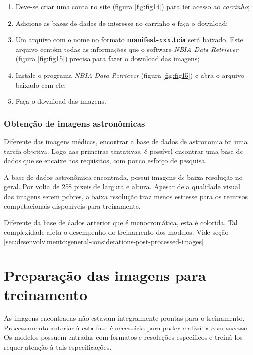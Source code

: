 \begin{enumerate}
    \item Deve-se criar uma conta no site \cite{cancer_imaging_archive_cancer_2022} (figura \ref{fig:fig14}) para ter acesso ao \textit{carrinho};

    \item Adicione as bases de dados de interesse no carrinho e faça o download;

    \item Um arquivo com o nome no formato \textbf{manifest-xxx.tcia} será baixado. Este arquivo contém todas as informações que o software \textit{NBIA Data Retriever} (figura \ref{fig:fig15}) precisa para fazer o download das imagens;

    \item Instale o programa \textit{NBIA Data Retriever} (figura \ref{fig:fig15}) e abra o arquivo baixado com ele;

    \item Faça o download das imagens.
\end{enumerate}

\subsubsection{Obtenção de imagens astronômicas}
\label{sec:imagens_astronomicas}

Diferente das imagens médicas, encontrar a base de dados de astronomia foi uma tarefa objetiva. Logo nas primeiras tentativas, é possível encontrar uma base de dados que se encaixe nos requisitos, com pouco esforço de pesquisa.

A base de dados astronômica encontrada, possui imagens de baixa resolução no geral. Por volta de 258 pixeis de largura e altura. Apesar de a qualidade visual das imagens serem pobres, a baixa resolução traz menos estresse para os recursos computacionais disponíveis para treinamento.

Diferente da base de dados anterior que é monocromática, esta é colorida. Tal complexidade afeta o desempenho do treinamento dos modelos. Vide seção \ref{sec:desenvolvimento:general-considerations-post-processed-images}

\section{Preparação das imagens para treinamento}
\label{sec:prep-imgs}

As imagens encontradas não estavam integralmente prontas para o treinamento. Processamento anterior à esta fase é necessário para poder realizá-la com sucesso. Os modelos possuem entradas com formatos e resoluções específicos e treiná-los requer atenção à tais especificações.

